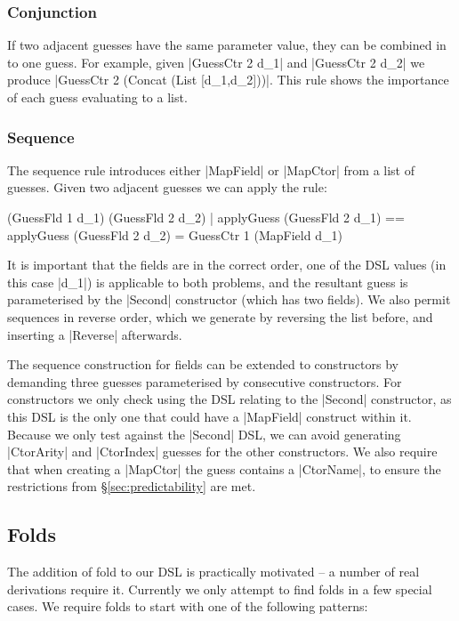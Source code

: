 \documentclass{llncs}
\begin{document}
\subsubsection{Conjunction}

If two adjacent guesses have the same parameter value, they can be combined in to one guess. For example, given |GuessCtr 2 d_1| and |GuessCtr 2 d_2| we produce |GuessCtr 2 (Concat (List [d_1,d_2]))|. This rule shows the importance of each guess evaluating to a list.

\subsubsection{Sequence}
\label{sec:guess_lists_sequence}

The sequence rule introduces either |MapField| or |MapCtor| from a list of guesses. Given two adjacent guesses we can apply the rule:

\ignore\begin{code}
(GuessFld 1 d_1) (GuessFld 2 d_2)
    | applyGuess (GuessFld 2 d_1) == applyGuess (GuessFld 2 d_2)
    = GuessCtr 1 (MapField d_1)
\end{code}

It is important that the fields are in the correct order, one of the DSL values (in this case |d_1|) is applicable to both problems, and the resultant guess is parameterised by the |Second| constructor (which has two fields). We also permit sequences in reverse order, which we generate by reversing the list before, and inserting a |Reverse| afterwards.

The sequence construction for fields can be extended to constructors by demanding three guesses parameterised by consecutive constructors. For constructors we only check using the DSL relating to the |Second| constructor, as this DSL is the only one that could have a |MapField| construct within it. Because we only test against the |Second| DSL, we can avoid generating |CtorArity| and |CtorIndex| guesses for the other constructors. We also require that when creating a |MapCtor| the guess contains a |CtorName|, to ensure the restrictions from \S\ref{sec:predictability} are met.

\subsection{Folds}

The addition of fold to our DSL is practically motivated -- a number of real derivations require it. Currently we only attempt to find folds in a few special cases. We require folds to start with one of the following patterns:
\end{document}
